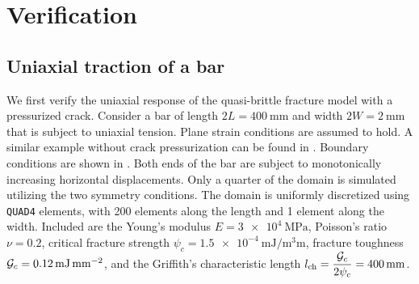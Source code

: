 \section{Verification}
\label{section: Chapter3/verification}

\subsection{Uniaxial traction of a bar}
\label{section: Chapter3/verification/bar}

We first verify the uniaxial response of the quasi-brittle fracture model with a pressurized crack. Consider a bar of length $2L = \SI{400}{\milli\meter}$ and width $2W = \SI{2}{\milli\meter}$ that is subject to uniaxial tension. Plane strain conditions are assumed to hold. A similar example without crack pressurization can be found in \cite{JYWu2017}. Boundary conditions are shown in . Both ends of the bar are subject to monotonically increasing horizontal displacements. Only a quarter of the domain is simulated utilizing the two symmetry conditions. The domain is uniformly discretized using \texttt{QUAD4} elements, with 200 elements along the length and 1 element along the width.
Included are the Young's modulus $E = \SI{3e4}{\mega\pascal}$, Poisson's ratio $\nu = 0.2$, critical fracture strength $\psi_c = \SI{1.5e-4}{\milli\joule\per\cubic\milli\meter}$, fracture toughness ${\mathcal{G}_c} = \SI{0.12}{\milli\joule\per\square\milli\meter}$, and the Griffith’s characteristic length $l_\text{ch} = \dfrac{{\mathcal{G}_c}}{2\psi_c} = \SI{400}{\milli\meter}$.

